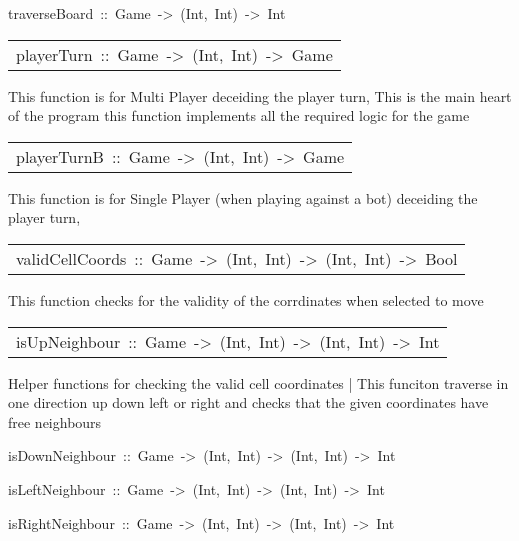 \begin{haddockdesc}
\item[
traverseBoard\ ::\ Game\ ->\ (Int,\ Int)\ ->\ Int
]
\end{haddockdesc}
\begin{haddockdesc}
\item[\begin{tabular}{@{}l}
playerTurn\ ::\ Game\ ->\ (Int,\ Int)\ ->\ Game
\end{tabular}]\haddockbegindoc
{}
 This function is for Multi Player deceiding the player turn,
 This is the main heart of the program this function implements all the required logic for the game\par

\end{haddockdesc}
\begin{haddockdesc}
\item[\begin{tabular}{@{}l}
playerTurnB\ ::\ Game\ ->\ (Int,\ Int)\ ->\ Game
\end{tabular}]\haddockbegindoc
{}
 This function is for Single Player (when playing against a bot) deceiding the player turn,\par

\end{haddockdesc}
\begin{haddockdesc}
\item[\begin{tabular}{@{}l}
validCellCoords\ ::\ Game\ ->\ (Int,\ Int)\ ->\ (Int,\ Int)\ ->\ Bool
\end{tabular}]\haddockbegindoc
{}
 This function checks for the validity of the corrdinates when selected to move\par

\end{haddockdesc}
\begin{haddockdesc}
\item[\begin{tabular}{@{}l}
isUpNeighbour\ ::\ Game\ ->\ (Int,\ Int)\ ->\ (Int,\ Int)\ ->\ Int
\end{tabular}]\haddockbegindoc
Helper functions for checking the valid cell coordinates
 | 
 This funciton traverse in one direction up down left or right and checks that the given coordinates have free neighbours\par

\end{haddockdesc}
\begin{haddockdesc}
\item[
isDownNeighbour\ ::\ Game\ ->\ (Int,\ Int)\ ->\ (Int,\ Int)\ ->\ Int
]
\item[
isLeftNeighbour\ ::\ Game\ ->\ (Int,\ Int)\ ->\ (Int,\ Int)\ ->\ Int
]
\item[
isRightNeighbour\ ::\ Game\ ->\ (Int,\ Int)\ ->\ (Int,\ Int)\ ->\ Int
]
\end{haddockdesc}

